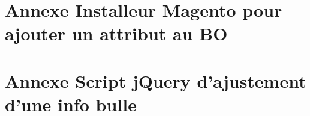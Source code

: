 \documentclass[a4paper,11pt,twoside]{report}
\begin{document}
    \newpage
  
  \section*{Annexe Installeur Magento pour ajouter un attribut au BO}
  \label{installeur_Magento_pour_ajouter_un_attribut_au_BO}
  
  
    \newpage
  
  \section*{Annexe Script jQuery d'ajustement d'une info bulle}
  \label{script_jQuery_d_ajustement_d_une_info_bulle}
  
\listoffigures
\thispagestyle{\chead{}}
\end{document}
